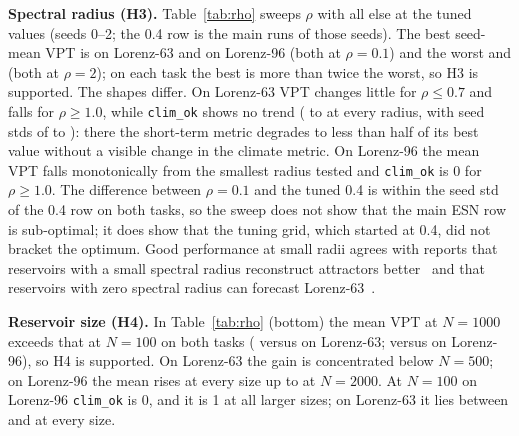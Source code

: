 \textbf{Spectral radius (H3).} Table~\ref{tab:rho} sweeps $\rho$ with all else at the tuned values (seeds 0--2; the 0.4 row is the main runs of those seeds). The best seed-mean VPT is  on Lorenz-63 and  on Lorenz-96 (both at $\rho=0.1$) and the worst  and  (both at $\rho=2$); on each task the best is more than twice the worst, so H3 is supported. The shapes differ. On Lorenz-63 VPT changes little for $\rho\le0.7$ and falls for $\rho\ge1.0$, while \texttt{clim\_ok} shows no trend ( to  at every radius, with seed stds of  to ): there the short-term metric degrades to less than half of its best value without a visible change in the climate metric. On Lorenz-96 the mean VPT falls monotonically from the smallest radius tested and \texttt{clim\_ok} is 0 for $\rho\ge1.0$. The difference between $\rho=0.1$ and the tuned 0.4 is within the seed std of the 0.4 row on both tasks, so the sweep does not show that the main ESN row is sub-optimal; it does show that the tuning grid, which started at 0.4, did not bracket the optimum. Good performance at small radii agrees with reports that reservoirs with a small spectral radius reconstruct attractors better~\cite{hart2023attractor} and that reservoirs with zero spectral radius can forecast Lorenz-63~\cite{griffith2019forecasting}.

\begin{table}[t]\centering\caption{ESN VPT and \texttt{clim\_ok} versus spectral radius $\rho$ (top; the 0.4 row is the tuned setting) and versus reservoir size $N$ (bottom). Mean $\pm$ std, seeds 0--2.}\label{tab:rho}
\small\setlength{\tabcolsep}{3pt}

\vspace{3pt}\end{table}

\textbf{Reservoir size (H4).} In Table~\ref{tab:rho} (bottom) the mean VPT at $N=1000$ exceeds that at $N=100$ on both tasks ( versus  on Lorenz-63;  versus  on Lorenz-96), so H4 is supported. On Lorenz-63 the gain is concentrated below $N=500$; on Lorenz-96 the mean rises at every size up to  at $N=2000$. At $N=100$ on Lorenz-96 \texttt{clim\_ok} is 0, and it is 1 at all larger sizes; on Lorenz-63 it lies between  and  at every size.
